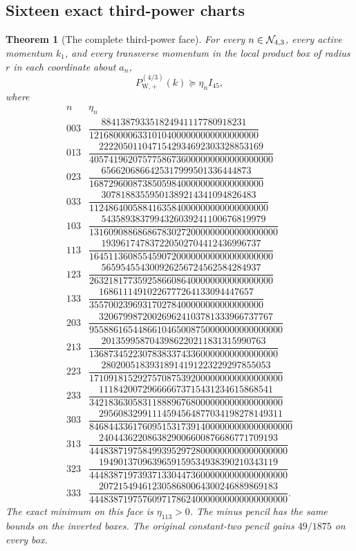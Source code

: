 \documentclass[11pt,oneside]{article}
\newtheorem{theorem}{Theorem}[section]
\theoremstyle{definition}
\theoremstyle{remark}
\begin{document}
\subsection{Sixteen exact third-power charts}

\begin{theorem}[The complete third-power face]
\label{thm:newv41-sixteen-charts}
For every \(n\in{\cal N}_{4,3}\), every active momentum \(k_1\),
and every transverse momentum in the local product box of radius
\(r\) in each coordinate about \(a_n\),
\[
 P_{\mathrm W,+}^{(4/3)}(k)\succeq\eta_n I_{45},       \tag{41.3}
\]
where
\[
\begin{array}{c|c}
n&\eta_n\\ \hline
003&\dfrac{884138793351824941117780918231}
{12168000063310104000000000000000000}\\[5pt]
013&\dfrac{2222050110471542934692303328853169}
{40574196207577586736000000000000000000}\\[5pt]
023&\dfrac{6566206866425317999501336444873}
{168729600873850598400000000000000000}\\[5pt]
033&\dfrac{30781883559501389214341094826483}
{1124864005884163584000000000000000000}\\[5pt]
103&\dfrac{5435893837994326039241100676819979}
{131609088686867830272000000000000000000}\\[5pt]
113&\dfrac{193961747837220502704412436996737}
{16451136085545907200000000000000000000}\\[5pt]
123&\dfrac{565954554300926256724562584284937}
{26321817735925866086400000000000000000}\\[5pt]
133&\dfrac{16861114910226777264133094447657}
{355700239693170278400000000000000000}\\[5pt]
203&\dfrac{320679987200269624103781333966737767}
{9558861654486610465008750000000000000000}\\[5pt]
213&\dfrac{2013599587043986220211831315990763}
{136873452230783833743360000000000000000}\\[5pt]
223&\dfrac{28020051839318914191223229297855053}
{1710918152927570875392000000000000000000}\\[5pt]
233&\dfrac{111842007296666673715431234615868541}
{3421836305831188896768000000000000000000}\\[5pt]
303&\dfrac{29560832991114594564877034198278149311}
{846844336176095153173914000000000000000000}\\[5pt]
313&\dfrac{2404436220863829006600876686771709193}
{44483871975849939529728000000000000000000}\\[5pt]
323&\dfrac{1949013709639659159534938390210343119}
{44483871973937133044736000000000000000000}\\[5pt]
333&\dfrac{2072154946123058680064300246889869183}
{44483871975760971786240000000000000000000}.
\end{array}                                             \tag{41.4}
\]
The exact minimum on this face is \(\eta_{113}>0\).  The minus
pencil has the same bounds on the inverted boxes.  The original
constant-two pencil gains \(49/1875\) on every box.
\end{theorem}
\end{document}

